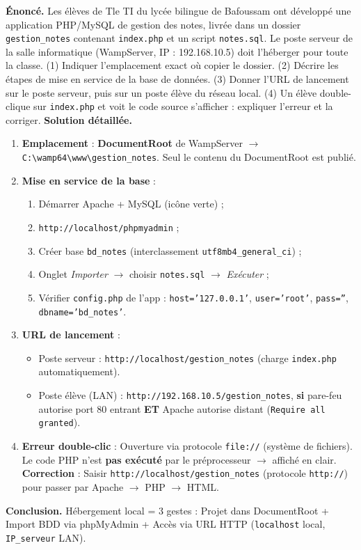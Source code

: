 \documentclass[11pt]{article}
\begin{document}
\begin{exoresolu}
\textbf{Énoncé.} Les élèves de Tle TI du lycée bilingue de Bafoussam ont développé une application PHP/MySQL de gestion des notes, livrée dans un dossier \texttt{gestion\_notes} contenant \texttt{index.php} et un script \texttt{notes.sql}. Le poste serveur de la salle informatique (WampServer, IP : 192.168.10.5) doit l'héberger pour toute la classe. (1) Indiquer l'emplacement exact où copier le dossier. (2) Décrire les étapes de mise en service de la base de données. (3) Donner l'URL de lancement sur le poste serveur, puis sur un poste élève du réseau local. (4) Un élève double-clique sur \texttt{index.php} et voit le code source s'afficher : expliquer l'erreur et la corriger.
\tcblower
\textbf{Solution détaillée.}
\begin{enumerate}
\item \textbf{Emplacement} : \textbf{DocumentRoot} de WampServer $\rightarrow$ \texttt{C:\textbackslash wamp64\textbackslash www\textbackslash gestion\_notes}. Seul le contenu du DocumentRoot est publié.
\item \textbf{Mise en service de la base} :
\begin{enumerate}
\item Démarrer Apache + MySQL (icône verte) ;
\item \texttt{http://localhost/phpmyadmin} ;
\item Créer base \texttt{bd\_notes} (interclassement \texttt{utf8mb4\_general\_ci}) ;
\item Onglet \emph{Importer} $\rightarrow$ choisir \texttt{notes.sql} $\rightarrow$ \emph{Exécuter} ;
\item Vérifier \texttt{config.php} de l'app : \texttt{host='127.0.0.1'}, \texttt{user='root'}, \texttt{pass=''}, \texttt{dbname='bd\_notes'}.
\end{enumerate}
\item \textbf{URL de lancement} :
\begin{itemize}
\item Poste serveur : \texttt{http://localhost/gestion\_notes} (charge \texttt{index.php} automatiquement).
\item Poste élève (LAN) : \texttt{http://192.168.10.5/gestion\_notes}, \textbf{si} pare-feu autorise port 80 entrant \textbf{ET} Apache autorise distant (\texttt{Require all granted}).
\end{itemize}
\item \textbf{Erreur double-clic} : Ouverture via protocole \texttt{file://} (système de fichiers). Le code PHP n'est \textbf{pas exécuté} par le préprocesseur $\rightarrow$ affiché en clair. \textbf{Correction} : Saisir \texttt{http://localhost/gestion\_notes} (protocole \texttt{http://}) pour passer par Apache $\rightarrow$ PHP $\rightarrow$ HTML.
\end{enumerate}
\textbf{Conclusion.} Hébergement local = 3 gestes : Projet dans DocumentRoot + Import BDD via phpMyAdmin + Accès via URL HTTP (\texttt{localhost} local, \texttt{IP\_serveur} LAN).
\end{exoresolu}
\end{document}
